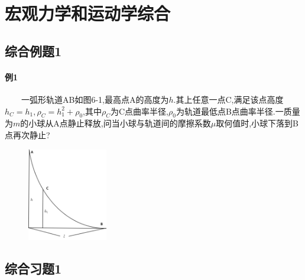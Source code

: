 \section{宏观力学和运动学综合}
\subsection{综合例题1}
\paragraph{例1}\ \ \ \ 一弧形轨道AB如图6-1,最高点A的高度为$h$.其上任意一点C,满足该点高度$h_C=h_1,\rho_C=h^2_1+\rho_0$,其中$\rho_C$为C点曲率半径,$\rho_0$为轨道最低点B点曲率半径.一质量为$m$的小球从A点静止释放,问当小球与轨道间的摩擦系数$\mu$取何值时,小球下落到B点再次静止?\\\begin{figure}\includegraphics[width=3.5cm]{6-1}\end{figure}
	
\subsection{综合习题1}